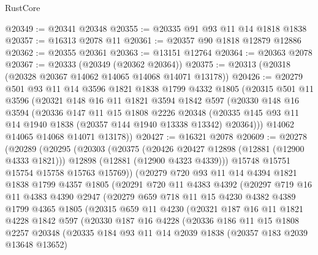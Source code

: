 \begin{lexlean}{RustCore}
\begin{coremodule}
@20349 := @20341 @20348
@20355 := @20335 @91 @93 @11 @14 @1818 @1838
@20357 := @16313 @2078 @11
@20361 := @20357 @90 @1818 @12879 @12886
@20362 := @20355 @20361
@20363 := @13151 @12764
@20364 := @20363 @2078
@20367 := @20333 (@20349 (@20362 @20364))
@20375 := @20313 (@20318 (@20328 @20367 @14062 @14065 @14068 @14071 @13178))
@20426 := @20279
    @501
    @93
    @11
    @14
    @3596
    @1821
    @1838
    @1799
    @4332
    @1805
    (@20315
      @501
      @11
      @3596
      (@20321
        @148
        @16
        @11
        @1821
        @3594
        @1842
        @597
        (@20330
          @148
          @16
          @3594
          (@20336
            @147
            @11
            @15
            @1808
            @2226
            @20348
            (@20335 @145 @93 @11 @14 @1940 @1838 (@20357 @144 @1940 @13338 @13342) @20364)))
        @14062
        @14065
        @14068
        @14071
        @13178))
@20427 := @16321 @2078
@20609 := @20278
    (@20289
      (@20295
        (@20303
          (@20375
            (@20426 @20427 @12898 (@12881 (@12900 @4333 @1821)))
            @12898
            (@12881 (@12900 @4323 @4339)))
          @15748
          @15751
          @15754
          @15758
          @15763
          @15769))
      (@20279
        @720
        @93
        @11
        @14
        @4394
        @1821
        @1838
        @1799
        @4357
        @1805
        (@20291
          @720
          @11
          @4383
          @4392
          (@20297
            @719
            @16
            @11
            @4383
            @4390
            @2947
            (@20279
              @659
              @718
              @11
              @15
              @4230
              @4382
              @4389
              @1799
              @4365
              @1805
              (@20315
                @659
                @11
                @4230
                (@20321
                  @187
                  @16
                  @11
                  @1821
                  @4228
                  @1842
                  @597
                  (@20330
                    @187
                    @16
                    @4228
                    (@20336
                      @186
                      @11
                      @15
                      @1808
                      @2257
                      @20348
                      (@20335
                        @184
                        @93
                        @11
                        @14
                        @2039
                        @1838
                        (@20357 @183 @2039 @13648 @13652)

\end{coremodule}
\end{lexlean}
